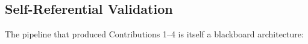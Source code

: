 \documentclass{article}
\begin{document}
\subsection{Self-Referential Validation}
\label{sec:exp-self}

%
%
%
%
%
%
%
%
%
%

The pipeline that produced Contributions 1--4 is itself a blackboard architecture:
\end{document}
